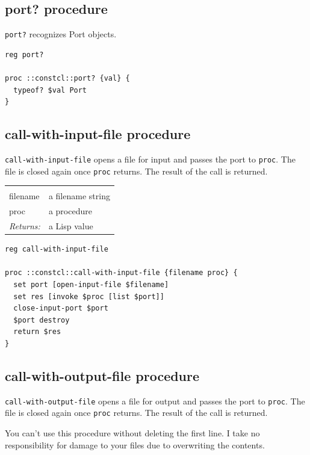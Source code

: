 \documentclass[twoside,9pt]{report}
\begin{document}
\subsection{port? procedure}
\label{port?-procedure}


\texttt{port?} recognizes Port objects.

\begin{lstlisting}
reg port?
 
proc ::constcl::port? {val} {
  typeof? $val Port
}
\end{lstlisting}
\subsection{call-with-input-file procedure}
\label{call-with-input-file-procedure}


\texttt{call-with-input-file} opens a file for input and passes the port to \texttt{proc}. The file is closed again once \texttt{proc} returns. The result of the call is returned.

\noindent\begin{tabular}{ |p{1.5cm} p{8cm}| }
\hline
\rowcolor[HTML]{CCCCCC} \multicolumn{2}{|l|}{\bf call-with-input-file (public)} \\
filename & a filename string \\
proc & a procedure \\
\textit{Returns:} & a Lisp value \\
\hline
\end{tabular}
\begin{lstlisting}
reg call-with-input-file
 
proc ::constcl::call-with-input-file {filename proc} {
  set port [open-input-file $filename]
  set res [invoke $proc [list $port]]
  close-input-port $port
  $port destroy
  return $res
}
\end{lstlisting}
\subsection{call-with-output-file procedure}
\label{call-with-output-file-procedure}


\texttt{call-with-output-file} opens a file for output and passes the port to \texttt{proc}. The file is closed again once \texttt{proc} returns. The result of the call is returned.


You can't use this procedure without deleting the first line. I take no responsibility for damage to your files due to overwriting the contents.
\end{document}
